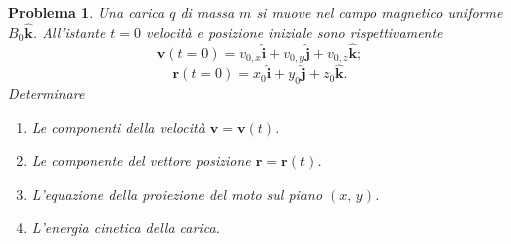 \documentclass[a4paper,oneside]{article}
\newtheorem{problema}{Problema}
\renewcommand{\vec}[1]{\mathbf{#1}}
\renewcommand{\hat}[1]{\widehat{\mathbf{#1}}}
\begin{document}
\begin{problema}
	Una carica $q$ di massa $m$ si muove nel campo magnetico uniforme $B_0\hat{k}$. All'istante $t=0$ velocità e posizione iniziale sono rispettivamente
	$$
	\vec{v}(t=0) = v_{0,x}\hat{i} + v_{0,y}\hat{j} + v_{0,z}\hat{k};
	$$
	$$
	\vec{r}(t=0) = x_0\hat{i} + y_0\hat{j} + z_0\hat{k}.
	$$
	Determinare
	\begin{enumerate}
		\item Le componenti della velocità $\vec{v} = \vec{v}(t)$.
		\item Le componente del vettore posizione $\vec{r} = \vec{r}(t)$.
		\item L'equazione della proiezione del moto sul piano $(x,\,y)$.
		\item L'energia cinetica della carica.
	\end{enumerate}
\end{problema}
\end{document}
